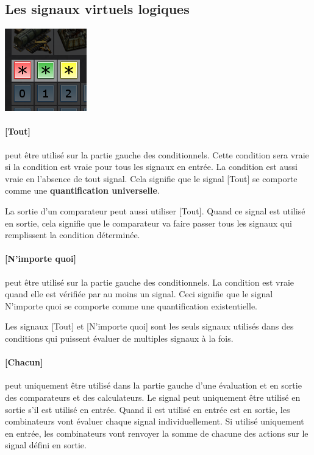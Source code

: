 \subsection{Les signaux virtuels logiques}

\begin{minipage}[t]{\textwidth}

{
\centering
\includegraphics{pics/factorio-logic-signals.png}
}


\end{minipage} 

\paragraph{[Tout]}
peut être utilisé sur la partie gauche des conditionnels. 
Cette condition sera vraie si la condition est vraie pour tous les signaux en entrée. 
La condition est aussi vraie en l'absence de tout signal. 
Cela signifie que le signal [Tout] se comporte comme une \textbf{quantification universelle}.

La sortie d'un comparateur peut aussi utiliser [Tout]. 
Quand ce signal est utilisé en sortie, cela signifie que le comparateur va faire passer tous les signaux qui remplissent la condition déterminée.  

\paragraph{[N'importe quoi]} 
peut être utilisé sur la partie gauche des conditionnels. 
La condition est vraie quand elle est vérifiée par au moins un signal. 
Ceci signifie que le signal N'importe quoi se comporte comme une quantification existentielle. 

\begin{result}
Les signaux [Tout] et [N'importe quoi] sont les seuls signaux utilisés dans des conditions qui puissent évaluer de multiples signaux à la fois.
\end{result}

\paragraph{[Chacun]}
peut uniquement être utilisé dans la partie gauche d'une évaluation et en sortie des comparateurs et des calculateurs.
Le signal peut uniquement être utilisé en sortie s'il est utilisé en entrée. 
Quand il est utilisé en entrée est en sortie, les combinateurs vont évaluer chaque signal individuellement. 
Si utilisé uniquement en entrée, les combinateurs vont renvoyer la somme de chacune des actions sur le signal défini en sortie. 

